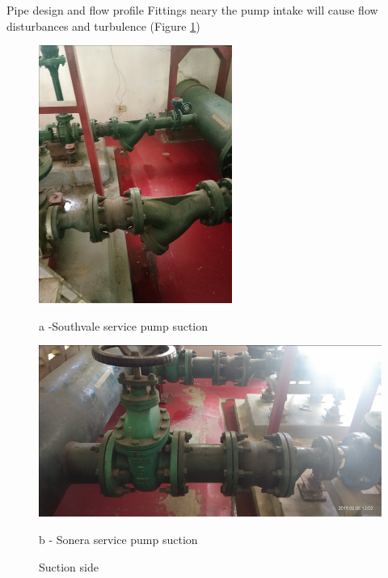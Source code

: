 Pipe design and flow profile 
Fittings neary the pump intake will cause flow disturbances and turbulence (Figure \ref{fig_ch043_suction_fittings}) 

\begin{figure}[!htb]
	\begin{minipage}[b]{0.5\linewidth}
		\centering
		\includegraphics[width=\textwidth]{figures/fig_ch043_suction_fittings1}
		\caption*{a -Southvale service pump suction}
	\end{minipage}
	\hspace{0.05cm}
	\begin{minipage}[b]{0.5\linewidth}
		\centering
		\includegraphics[width=\textwidth]{figures/fig_ch043_suction_fittings2}
		\caption*{b - Sonera service pump suction}
	\end{minipage}
	\caption{Suction side}
	\label{fig_ch043_suction_fittings}
\end{figure}



